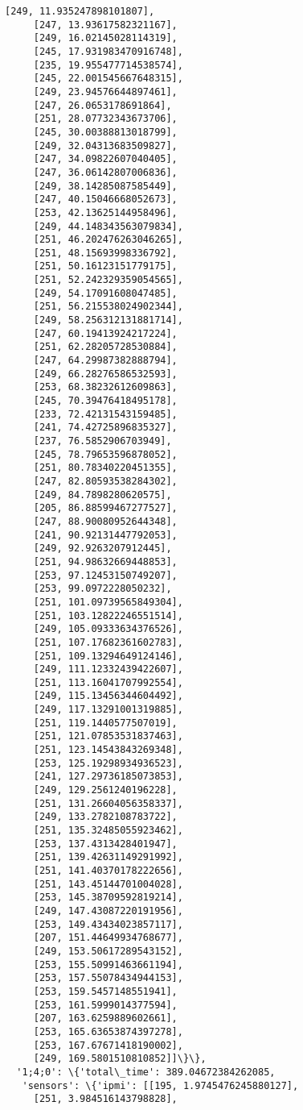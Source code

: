 \documentclass[11pt]{article}
\begin{document}
\begin{tcolorbox}[breakable, size=fbox, boxrule=.5pt, pad at break*=1mm, opacityfill=0]
\begin{Verbatim}[commandchars=\\\{\}]
     [249, 11.935247898101807],
     [247, 13.93617582321167],
     [249, 16.02145028114319],
     [245, 17.931983470916748],
     [235, 19.955477714538574],
     [245, 22.001545667648315],
     [249, 23.94576644897461],
     [247, 26.0653178691864],
     [251, 28.07732343673706],
     [245, 30.00388813018799],
     [249, 32.04313683509827],
     [247, 34.09822607040405],
     [247, 36.06142807006836],
     [249, 38.14285087585449],
     [247, 40.15046668052673],
     [253, 42.13625144958496],
     [249, 44.148343563079834],
     [251, 46.202476263046265],
     [251, 48.15693998336792],
     [251, 50.16123151779175],
     [251, 52.242329359054565],
     [249, 54.17091608047485],
     [251, 56.215538024902344],
     [249, 58.256312131881714],
     [247, 60.19413924217224],
     [251, 62.28205728530884],
     [247, 64.29987382888794],
     [249, 66.28276586532593],
     [253, 68.38232612609863],
     [245, 70.39476418495178],
     [233, 72.42131543159485],
     [241, 74.42725896835327],
     [237, 76.5852906703949],
     [245, 78.79653596878052],
     [251, 80.78340220451355],
     [247, 82.80593538284302],
     [249, 84.7898280620575],
     [205, 86.88599467277527],
     [247, 88.90080952644348],
     [241, 90.92131447792053],
     [249, 92.9263207912445],
     [251, 94.98632669448853],
     [253, 97.12453150749207],
     [253, 99.0972228050232],
     [251, 101.09739565849304],
     [251, 103.12822246551514],
     [249, 105.09333634376526],
     [251, 107.17682361602783],
     [251, 109.13294649124146],
     [249, 111.12332439422607],
     [251, 113.16041707992554],
     [249, 115.13456344604492],
     [249, 117.13291001319885],
     [251, 119.1440577507019],
     [251, 121.07853531837463],
     [251, 123.14543843269348],
     [253, 125.19298934936523],
     [241, 127.29736185073853],
     [249, 129.2561240196228],
     [251, 131.26604056358337],
     [249, 133.2782108783722],
     [251, 135.32485055923462],
     [253, 137.4313428401947],
     [251, 139.42631149291992],
     [251, 141.40370178222656],
     [251, 143.45144701004028],
     [253, 145.38709592819214],
     [249, 147.43087220191956],
     [253, 149.43434023857117],
     [207, 151.44649934768677],
     [249, 153.50617289543152],
     [253, 155.50991463661194],
     [253, 157.55078434944153],
     [253, 159.5457148551941],
     [253, 161.5999014377594],
     [207, 163.6259889602661],
     [253, 165.63653874397278],
     [253, 167.67671418190002],
     [249, 169.5801510810852]]\}\},
  '1;4;0': \{'total\_time': 389.04672384262085,
   'sensors': \{'ipmi': [[195, 1.9745476245880127],
     [251, 3.984516143798828],

\end{Verbatim}
\end{tcolorbox}
\end{document}
